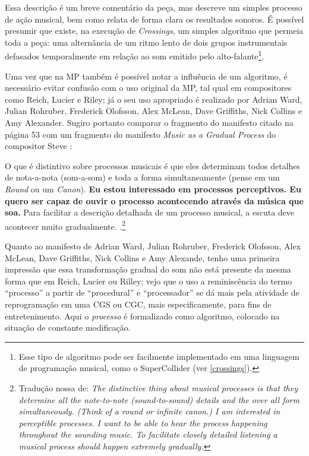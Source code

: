 Essa descrição é um breve comentário da peça, mas descreve um simples processo de ação musical, bem como relata de forma clara os resultados sonoros. É possível presumir que existe, na execução de \emph{Crossings}, um simples algoritmo que permeia toda a peça: uma alternância de um ritmo lento de dois grupos instrumentais defasados temporalmente em relação ao som emitido pelo alto-falante\footnote{Esse tipo de algoritmo pode ser facilmente implementado em uma linguagem de programação musical, como o SuperCollider (ver \autoref{crossings}).}.

Uma vez que na MP também é possível notar a influência de um algoritmo, é necessário evitar confusão com o uso original da MP, tal qual em compositores como Reich, Lucier e Riley; já o seu uso apropriado é realizado por Adrian Ward, Julian Rohruber, Frederick Olofsson, Alex McLean, Dave Griffiths, Nick Collins e Amy Alexander. Sugiro portanto comparar o fragmento do manifesto citado na página 53 com um fragmento do manifesto \emph{Music as a Gradual Process} do compositor Steve : 

\begin{citacao}
O que é distintivo sobre processos musicais é que eles determinam todos detalhes de nota-a-nota (som-a-som) e toda a forma simultaneamente (pense em um \emph{Round} ou um \emph{Canon}). \textbf{Eu estou interessado em processos perceptivos. Eu quero ser capaz de ouvir o processo acontecendo através da música que soa.} Para facilitar a descrição detalhada de um processo musical, a escuta  deve acontecer muito gradualmente. \cite[p.~1]{reich_music_1968}.\footnote{Tradução nossa de: \emph{The distinctive thing about musical processes is that they determine all the note-to-note (sound-to-sound) details and the over all form simultaneously. (Think of a round or infinite canon.) I am interested in perceptible processes. I want to be able to hear the  process happening throughout the sounding music. To facilitate closely detailed listening a musical process should happen extremely gradually. }}
\end{citacao}

Quanto ao manifesto de Adrian Ward, Julian Rohruber, Frederick Olofsson, Alex McLean, Dave Griffiths, Nick Collins e Amy Alexande, tenho uma primeira impressão que essa transformação gradual do som não está presente da mesma forma que em Reich, Lucier ou Rilley; vejo que o uso a reminiscência do termo ``processo'' a partir de ``procedural'' e ``processador'' se dá mais pela atividade de reprogramação em uma CGS ou CGC, mais especificamente, para fins de entretenimento. Aqui o \emph{processo} é formalizado como algoritmo, colocado na situação de constante modificação.

